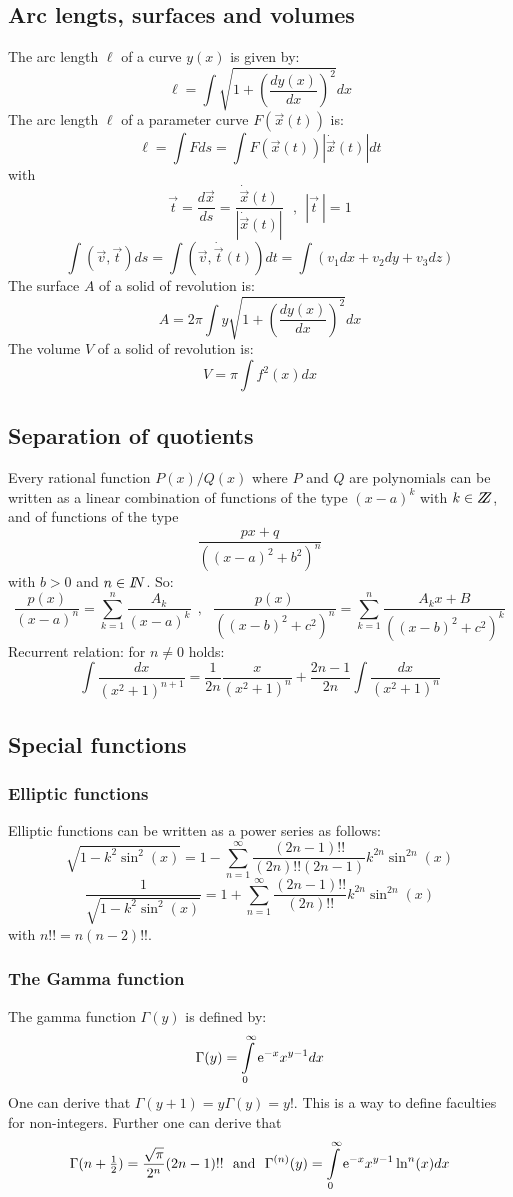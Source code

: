 \documentclass[a4paper,fancyheadings,twoside]{report}
\begin{document}
\subsection{Arc lengts, surfaces and volumes}
The arc length $\ell$ of a curve $y(x)$ is given by:
\[
\ell=\int\sqrt{1+\left(\frac{dy(x)}{dx}\right)^2}dx
\]
The arc length $\ell$ of a parameter curve $F(\vec{x}(t))$ is:
\[
\ell=\int Fds=\int F(\vec{x}(t))|\dot{\vec{x}}(t)|dt
\]
with
\[
\vec{t}=\frac{d\vec{x}}{ds}=\frac{\dot{\vec{x}}(t)}{|\dot{\vec{x}}(t)|}~~~,~~|\vec{t}~|=1
\]
\[
\int(\vec{v},\vec{t})ds=\int(\vec{v},\dot{\vec{t}}(t))dt=\int(v_1dx+v_2dy+v_3dz)
\]
The surface $A$ of a solid of revolution is:
\[
A=2\pi\int y\sqrt{1+\left(\frac{dy(x)}{dx}\right)^2}dx
\]
The volume $V$ of a solid of revolution is:
\[
V=\pi\int f^2(x)dx
\]

\subsection{Separation of quotients}
\label{sec:breuksplits}
Every rational function $P(x)/Q(x)$ where $P$ and $Q$ are polynomials can be
written as a linear combination of functions of the type $(x-a)^k$ with
$k\in Z\hspace{-1ex}Z$, and of functions of the type
\[
\frac{px+q}{((x-a)^2+b^2)^n}
\]
with $b>0$ and $n\in I\hspace{-1mm}N$. So:
\[
\frac{p(x)}{(x-a)^n}=\sum_{k=1}^n\frac{A_k}{(x-a)^k}~~,~~~
\frac{p(x)}{((x-b)^2+c^2)^n}=\sum_{k=1}^n \frac{A_kx+B}{((x-b)^2+c^2)^k}
\]
Recurrent relation: for $n\neq0$ holds:
\[
\int\frac{dx}{(x^2+1)^{n+1}}=\frac{1}{2n}\frac{x}{(x^2+1)^n}+\frac{2n-1}{2n}\int\frac{dx}{(x^2+1)^n}
\]

\subsection{Special functions}
\subsubsection{Elliptic functions}
Elliptic functions can be written as a power series as follows:
\[
\sqrt{1-k^2\sin^2(x)}=1-\sum_{n=1}^\infty\frac{(2n-1)!!}{(2n)!!(2n-1)}k^{2n}\sin^{2n}(x)
\]
\[
\frac{1}{\sqrt{1-k^2\sin^2(x)}}=1+\sum_{n=1}^\infty\frac{(2n-1)!!}{(2n)!!}k^{2n}\sin^{2n}(x)
\]
with $n!!=n(n-2)!!$.

\subsubsection{The Gamma function}
The gamma function $\Gamma(y)$ is defined by:
\[
\Gamma(y)=\int\limits_0^\infty{\rm e}^{-x}x^{y-1}dx
\]
One can derive that $\Gamma(y+1)=y\Gamma(y)=y!$. This is a way to define
faculties for non-integers. Further one can derive that
\[
\Gamma(n+\mbox{$\frac{1}{2}$})=\frac{\sqrt{\pi}}{2^n}(2n-1)!!~~\mbox{and}~~
\Gamma^{(n)}(y)=\int\limits_0^\infty{\rm e}^{-x}x^{y-1}\ln^n(x)dx
\]
\end{document}
